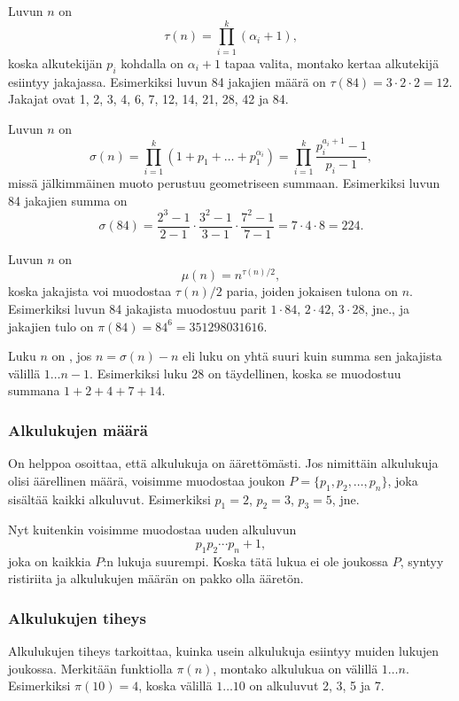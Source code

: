 Luvun $n$  on
\[\tau(n)=\prod_{i=1}^k (\alpha_i+1),\]
koska alkutekijän $p_i$ kohdalla on $\alpha_i+1$
tapaa valita, montako kertaa alkutekijä
esiintyy jakajassa.
Esimerkiksi luvun 84 jakajien määrä
on $\tau(84)=3 \cdot 2 \cdot 2 = 12$.
Jakajat ovat
1, 2, 3, 4, 6, 7, 12, 14, 21, 28, 42 ja 84.

Luvun $n$  on
\[\sigma(n)=\prod_{i=1}^k (1+p_1+\ldots+p_1^{\alpha_i}) = \prod_{i=1}^k \frac{p_i^{a_i+1}-1}{p_i-1},\]
missä jälkimmäinen muoto perustuu geometriseen summaan.
Esimerkiksi luvun 84 jakajien summa on
\[\sigma(84)=\frac{2^3-1}{2-1} \cdot \frac{3^2-1}{3-1} \cdot \frac{7^2-1}{7-1} = 7 \cdot 4 \cdot 8 = 224.\]

Luvun $n$  on
\[\mu(n)=n^{\tau(n)/2},\]
koska jakajista voi muodostaa
$\tau(n)/2$ paria, joiden jokaisen tulona on $n$.
Esimerkiksi luvun 84 jakajista muodostuu parit
$1 \cdot 84$, $2 \cdot 42$, $3 \cdot 28$, jne.,
ja jakajien tulo on $\pi(84)=84^6=351298031616$.


Luku $n$ on , jos $n=\sigma(n)-n$
eli luku on yhtä suuri kuin summa sen jakajista
välillä $1 \ldots n-1$.
Esimerkiksi luku 28 on täydellinen, koska
se muodostuu summana $1+2+4+7+14$.

\subsubsection{Alkulukujen määrä}

On helppoa osoittaa, että alkulukuja on äärettömästi.
Jos nimittäin alkulukuja olisi äärellinen määrä,
voisimme muodostaa joukon $P=\{p_1,p_2,\ldots,p_n\}$,
joka sisältää kaikki alkuluvut.
Esimerkiksi $p_1=2$, $p_2=3$, $p_3=5$, jne.

Nyt kuitenkin voisimme muodostaa uuden alkuluvun
\[p_1 p_2 \cdots p_n+1,\]
joka on kaikkia $P$:n lukuja suurempi.
Koska tätä lukua ei ole joukossa $P$,
syntyy ristiriita ja alkulukujen määrän on
pakko olla ääretön.

\subsubsection{Alkulukujen tiheys}

Alkulukujen tiheys tarkoittaa, kuinka usein alkulukuja
esiintyy muiden lukujen joukossa.
Merkitään funktiolla $\pi(n)$, 
montako alkulukua on välillä $1 \ldots n$.
Esimerkiksi $\pi(10)=4$, koska välillä $1 \ldots 10$
on alkuluvut 2, 3, 5 ja 7.

